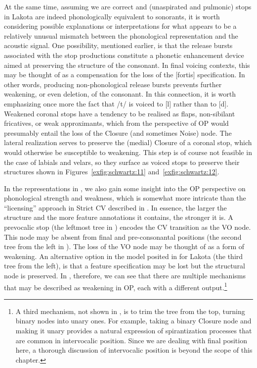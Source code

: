 \documentclass[output=paper]{langscibook}
\begin{document}
At the same time, assuming we are correct and (unaspirated and pulmonic) stops in Lakota are indeed phonologically equivalent to sonorants, it is worth considering possible explanations or interpretations for what appears to be a relatively unusual mismatch between the phonological representation and the acoustic signal. One possibility, mentioned earlier, is that the release bursts associated with the stop productions constitute a phonetic enhancement device aimed at preserving the structure of the consonant. In final voicing contexts, this may be thought of as a compensation for the loss of the [fortis] specification. In other words, producing non-phonological release bursts prevents further weakening, or even deletion, of the consonant. In this connection, it is worth emphasizing once more the fact that /t/ is voiced to [l] rather than to [d]. Weakened coronal stops have a tendency to be realised as flaps, non-sibilant fricatives, or weak approximants, which from the perspective of OP would presumably entail the loss of the Closure (and sometimes Noise) node. The lateral realization serves to preserve the (medial) Closure of a coronal stop, which would otherwise be susceptible to weakening. This step is of course not feasible in the case of labials and velars, so they surface as voiced stops to preserve their structures shown in Figures~\ref{exfig:schwartz:11} and~\ref{exfig:schwartz:12}.

\largerpage
In the representations in , we also gain some insight into the OP perspective on phonological strength and weakness, which is somewhat more intricate than the “licensing” approach in Strict CV described in . In essence, the larger the structure and the more feature annotations it contains, the stronger it is. A prevocalic stop (the leftmost tree in ) encodes the CV transition as the VO node. This node may be absent from final and pre-consonantal positions (the second tree from the left in ). The loss of the VO node may be thought of as a form of weakening. An alternative option in the model posited in  for Lakota (the third tree from the left), is that a feature specification may be lost but the structural node is preserved. In , therefore, we can see that there are multiple mechanisms that may be described as weakening in OP, each with a different output.\footnote{A third mechanism, not shown in , is to trim the tree from the top, turning binary nodes into unary ones. For example, taking a binary Closure node and making it unary provides a natural expression of spirantization processes that are common in intervocalic position. Since we are dealing with final position here, a thorough discussion of intervocalic position is beyond the scope of this chapter.}
\end{document}
